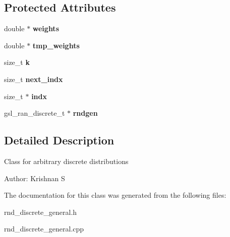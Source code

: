 \subsection*{Protected Attributes}
\begin{CompactItemize}
\item 
double $\ast$ \textbf{weights}\label{classRND__DISCRETE__GENERAL_38b0ce7466c61872374613269bdf9a1d}

\item 
double $\ast$ \textbf{tmp\_\-weights}\label{classRND__DISCRETE__GENERAL_a92e79805a843e005972d8e92f3c5963}

\item 
size\_\-t \textbf{k}\label{classRND__DISCRETE__GENERAL_5f07e56415d6fdc408731b767a16c7ed}

\item 
size\_\-t \textbf{next\_\-indx}\label{classRND__DISCRETE__GENERAL_9be40d95b9e58a7236fd0063d60579db}

\item 
size\_\-t $\ast$ \textbf{indx}\label{classRND__DISCRETE__GENERAL_b12cd353d354aeb7849fad3c06b625b8}

\item 
gsl\_\-ran\_\-discrete\_\-t $\ast$ \textbf{rndgen}\label{classRND__DISCRETE__GENERAL_aeaa2c6311ab434d879e96fed15819f8}

\end{CompactItemize}


\subsection{Detailed Description}
Class for arbitrary discrete distributions

\begin{Desc}
\item[Author:]Krishnan S \end{Desc}




The documentation for this class was generated from the following files:\begin{CompactItemize}
\item 
rnd\_\-discrete\_\-general.h\item 
rnd\_\-discrete\_\-general.cpp\end{CompactItemize}
